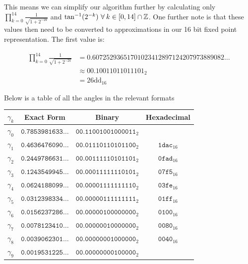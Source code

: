 {This means we can simplify our algorithm further by calculating only \(\prod_{k=0}^{14} \frac{1}{\sqrt{1 + 2^{-2k}}}\) and \(\tan^{-1}(2^{-k})\ \forall\: k \in [0,14] \cap \mathbb{Z}\). One further note is that these values then need to be converted to approximations in our 16 bit fixed point representation. The first value is: 

\begin{align*}
	\prod_{k=0}^{14} \frac{1}{\sqrt{1 + 2^{-2k}}} &= 
		0.60725293651701023412897124207973889082\ldots\\
		&\approx \textrm{00.10011011011101}_2\\
		&= \textrm{26dd}_{16}
\end{align*}

Below is a table of all the angles in the relevant formats

\begin{center}
\begin{tabular}{|c|c|c|c|}
	\hline
	\(\gamma_k\) & Exact Form & Binary & Hexadecimal \\\hline
	\(\gamma_0\) & \(\texttt{0.7853981633}\ldots\)
		& \(\texttt{00.11001001000011}_2\)
		& \(\texttt{3243}_{16}\\\hline
	\(\gamma_1\) & \(\texttt{0.4636476090}\ldots\)
		& \(\texttt{00.01110110101100}_2\)
		& \(\texttt{1dac}_{16}\)\\\hline
	\(\gamma_2\) & \(\texttt{0.2449786631}\ldots\)
		& \(\texttt{00.00111110101101}_2\)
		& \(\texttt{0fad}_{16}\)\\\hline
	\(\gamma_3\) & \(\texttt{0.1243549945}\ldots\)
		& \(\texttt{00.00011111110101}_2\)
		& \(\texttt{07f5}_{16}\)\\\hline
	\(\gamma_4\) & \(\texttt{0.0624188099}\ldots\)
		& \(\texttt{00.00001111111110}_2\)
		& \(\texttt{03fe}_{16}\)\\\hline
	\(\gamma_5\) & \(\texttt{0.0312398334}\ldots\)
		& \(\texttt{00.00000111111111}_2\)
		& \(\texttt{01ff}_{16}\)\\\hline
	\(\gamma_6\) & \(\texttt{0.0156237286}\ldots\)
		& \(\texttt{00.00000100000000}_2\)
		& \(\texttt{0100}_{16}\)\\\hline
	\(\gamma_7\) & \(\texttt{0.0078123410}\ldots\)
		& \(\texttt{00.00000010000000}_2\)
		& \(\texttt{0080}_{16}\)\\\hline
	\(\gamma_8\) & \(\texttt{0.0039062301}\ldots\)
		& \(\texttt{00.00000001000000}_2\)
		& \(\texttt{0040}_{16}\)\\\hline
	\(\gamma_9\) & \(\texttt{0.0019531225}\ldots\)
		& \(\texttt{00.00000000100000}_2\)

\end{tabular}
\end{center}}
